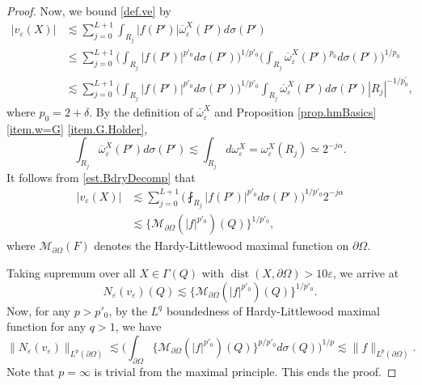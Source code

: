 \documentclass[reqno,12pt]{amsart} %
\theoremstyle{definition}
\theoremstyle{remark}
\numberwithin{equation}{section}
\newcommand{\M}{\mathcal{M}}
\newcommand{\e}{\varepsilon}
\DeclareMathOperator{\dist}{dist}
\begin{document}
\begin{proof}
    Now, we bound \eqref{def.ve} by
    \begin{equation}\label{est.BdryDecomp}
    \begin{aligned}
    |v_\e(X)| & \lesssim \sum_{j = 0}^{L+1} \int_{R_j} |f(P')| \overline{\omega}_\e^X(P') d\sigma(P')\\
    & \le \sum_{j = 0}^{L+1} \bigg(\int_{R_j} |f(P')|^{p'_0} d\sigma(P') \bigg)^{1/p'_0} \bigg( \int_{R_j} \overline{\omega}_\e^X(P')^{p_0} d\sigma(P') \bigg)^{1/p_0} \\
    & \lesssim \sum_{j = 0}^{L+1} \bigg(\int_{R_j} |f(P')|^{p'_0} d\sigma(P') \bigg)^{1/p'_0} \int_{R_j} \overline{\omega}_\e^X(P') d\sigma(P') |R_j|^{-1/p^\prime_0}, 
    \end{aligned}
\end{equation}
where $p_0=2+\delta$.
By the definition of $\overline{\omega}_\e^X$ and Proposition \ref{prop.hmBasics} \ref{item.w=G} \ref{item.G.Holder},
\begin{equation}
    \int_{R_j} \overline{\omega}_\e^X(P') d\sigma(P') \lesssim \int_{R_j} d \omega_\e^X = \omega_\e^X(R_j) \simeq 2^{-j\alpha}.
\end{equation}
It follows from \eqref{est.BdryDecomp} that
\begin{equation}
\begin{aligned}
    |v_\e(X)| & \lesssim \sum_{j = 0}^{L+1} \bigg(\fint_{R_j} |f(P')|^{p'_0} d\sigma(P') \bigg)^{1/p'_0} 2^{-j \alpha} \\ 
    & \lesssim \big\{ \M_{\partial \Omega}(|f|^{p'_0})(Q) \big\}^{1/{p'_0}},
\end{aligned}
\end{equation}
where $\M_{\partial \Omega}(F)$ denotes the Hardy-Littlewood maximal function on $\partial \Omega$.

Taking supremum over all $X\in \Gamma(Q)$ with $\dist(X,\partial \Omega) > 10\e$, we arrive at
\begin{equation}
    N_\e(v_\e)(Q) \lesssim \big\{ \M_{\partial \Omega}(|f|^{p'_0})(Q)\big\}^{1/{p'_0}}.
\end{equation}
Now, for any $p> p'_0$, by the $L^q$ boundedness of Hardy-Littlewood maximal function for any $q>1$, we have
\begin{equation}
    \| N_\e(v_\e) \|_{L^p(\partial \Omega)} \lesssim \bigg( \int_{\partial \Omega} \big\{ \M_{\partial \Omega}(|f|^{p'_0})(Q)\big\}^{p/{p'_0}} d\sigma(Q) \bigg)^{1/p} \lesssim \| f \|_{L^p(\partial \Omega)}.
\end{equation}
Note that $p = \infty$ is trivial from the maximal principle.
This ends the proof.
\end{proof}
\end{document}
